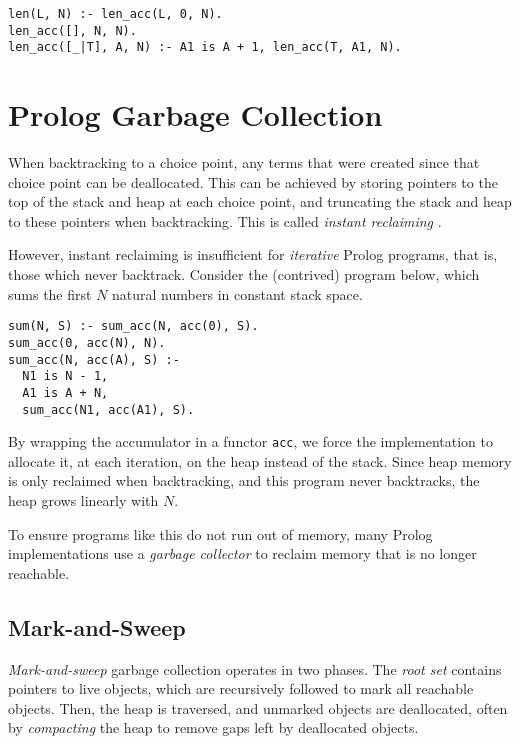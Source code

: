 \begin{center}
\begin{verbatim}
len(L, N) :- len_acc(L, 0, N).
len_acc([], N, N).
len_acc([_|T], A, N) :- A1 is A + 1, len_acc(T, A1, N).
\end{verbatim}
\end{center}

\section{Prolog Garbage Collection}

\label{sec:prolog-gc}

When backtracking to a choice point, any terms that were created since that choice point can be deallocated. This can be achieved by storing pointers to the top of the stack and heap at each choice point, and truncating the stack and heap to these pointers when backtracking. This is called \emph{instant reclaiming} \cite{bekkersDynamicMemoryManagement1992}.

However, instant reclaiming is insufficient for \emph{iterative} Prolog programs, that is, those which never backtrack. Consider the (contrived) program below, which sums the first $N$ natural numbers in constant stack space.

\begin{center}
\begin{verbatim}
sum(N, S) :- sum_acc(N, acc(0), S).
sum_acc(0, acc(N), N).
sum_acc(N, acc(A), S) :-
  N1 is N - 1,
  A1 is A + N,
  sum_acc(N1, acc(A1), S).
\end{verbatim}
\end{center}

By wrapping the accumulator in a functor \texttt{acc}, we force the implementation to allocate it, at each iteration, on the heap instead of the stack. Since heap memory is only reclaimed when backtracking, and this program never backtracks, the heap grows linearly with $N$.

To ensure programs like this do not run out of memory, many Prolog implementations use a \emph{garbage collector} to reclaim memory that is no longer reachable.

\subsection{Mark-and-Sweep}

\label{sec:prep-mark-and-sweep}

\emph{Mark-and-sweep} garbage collection operates in two phases. The \emph{root set} contains pointers to live objects, which are recursively followed to mark all reachable objects. Then, the heap is traversed, and unmarked objects are deallocated, often by \emph{compacting} the heap to remove gaps left by deallocated objects.

